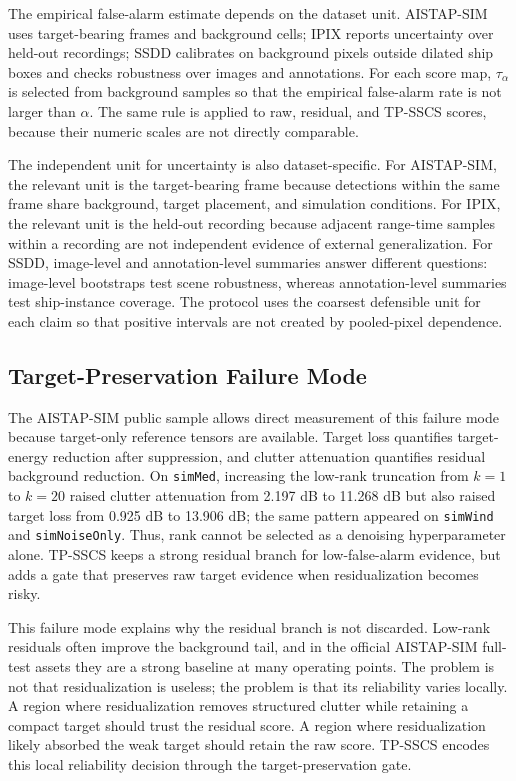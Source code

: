 \documentclass[journal]{IEEEtran}
\begin{document}
The empirical false-alarm estimate depends on the dataset unit. AISTAP-SIM uses target-bearing frames and background cells; IPIX reports uncertainty over held-out recordings; SSDD calibrates on background pixels outside dilated ship boxes and checks robustness over images and annotations. For each score map, $\tau_\alpha$ is selected from background samples so that the empirical false-alarm rate is not larger than $\alpha$. The same rule is applied to raw, residual, and TP-SSCS scores, because their numeric scales are not directly comparable.

The independent unit for uncertainty is also dataset-specific. For AISTAP-SIM, the relevant unit is the target-bearing frame because detections within the same frame share background, target placement, and simulation conditions. For IPIX, the relevant unit is the held-out recording because adjacent range-time samples within a recording are not independent evidence of external generalization. For SSDD, image-level and annotation-level summaries answer different questions: image-level bootstraps test scene robustness, whereas annotation-level summaries test ship-instance coverage. The protocol uses the coarsest defensible unit for each claim so that positive intervals are not created by pooled-pixel dependence.
\subsection{Target-Preservation Failure Mode}

The AISTAP-SIM public sample allows direct measurement of this failure mode because target-only reference tensors are available. Target loss quantifies target-energy reduction after suppression, and clutter attenuation quantifies residual background reduction. On \texttt{simMed}, increasing the low-rank truncation from $k=1$ to $k=20$ raised clutter attenuation from 2.197 dB to 11.268 dB but also raised target loss from 0.925 dB to 13.906 dB; the same pattern appeared on \texttt{simWind} and \texttt{simNoiseOnly}. Thus, rank cannot be selected as a denoising hyperparameter alone. TP-SSCS keeps a strong residual branch for low-false-alarm evidence, but adds a gate that preserves raw target evidence when residualization becomes risky.

This failure mode explains why the residual branch is not discarded. Low-rank residuals often improve the background tail, and in the official AISTAP-SIM full-test assets they are a strong baseline at many operating points. The problem is not that residualization is useless; the problem is that its reliability varies locally. A region where residualization removes structured clutter while retaining a compact target should trust the residual score. A region where residualization likely absorbed the weak target should retain the raw score. TP-SSCS encodes this local reliability decision through the target-preservation gate.
\end{document}
